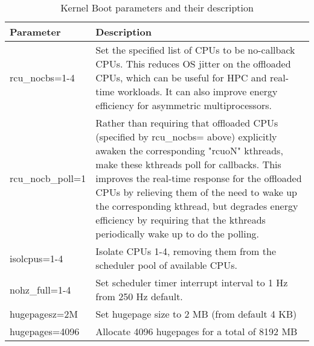 \begin{table}
    \centering
    \caption{Kernel Boot parameters and their description}
    \label{tab:kernel_params_table}
\begin{tabular}{|l|p{10cm}|}
    \hline
    Parameter & Description \\
    \hline \hline
    rcu\_nocbs=1-4 & Set the specified list of CPUs to be no-callback CPUs.  This reduces OS jitter on the   offloaded CPUs, which can be useful for HPC and real-time workloads.  It can also improve energy efficiency for asymmetric multiprocessors. \\ 
    \hline
    rcu\_nocb\_poll=1 & Rather than requiring that offloaded CPUs (specified by rcu\_nocbs= above) explicitly awaken the corresponding "rcuoN" kthreads, make these kthreads poll for callbacks. This improves the real-time response for the offloaded CPUs by relieving them of the need to wake up the corresponding kthread, but degrades energy efficiency by requiring that the kthreads periodically wake up to do the polling. \\
    \hline
    isolcpus=1-4 & Isolate CPUs 1-4, removing them from the scheduler pool of available CPUs. \\ 
    \hline
    nohz\_full=1-4 & Set scheduler timer interrupt interval to 1 Hz from 250 Hz default. \\ 
    \hline
    hugepagesz=2M & Set hugepage size to 2 MB (from default 4 KB) \\
    \hline
    hugepages=4096 & Allocate 4096 hugepages for a total of 8192 MB \\ 
    \hline
\end{tabular}
\end{table}
